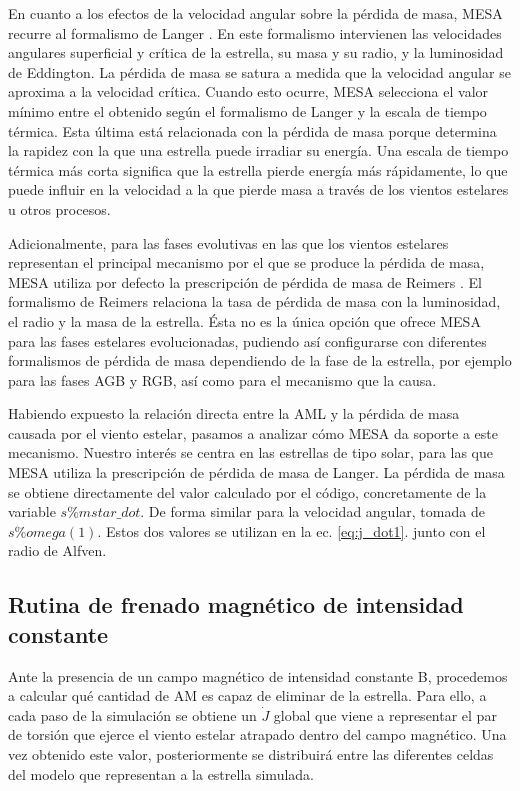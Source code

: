 En cuanto a los efectos de la velocidad angular sobre la pérdida de masa, MESA recurre al formalismo de Langer \cite{Langer1998, Paxton2013}. En este formalismo intervienen las velocidades angulares superficial y crítica de la estrella, su masa y su radio, y la luminosidad de Eddington. La pérdida de masa se satura a medida que la velocidad angular se aproxima a la velocidad crítica. Cuando esto ocurre, MESA selecciona el valor mínimo entre el obtenido según el formalismo de Langer y la escala de tiempo térmica. Esta última está relacionada con la pérdida de masa porque determina la rapidez con la que una estrella puede irradiar su energía. Una escala de tiempo térmica más corta significa que la estrella pierde energía más rápidamente, lo que puede influir en la velocidad a la que pierde masa a través de los vientos estelares u otros procesos.\par

Adicionalmente, para las fases evolutivas en las que los vientos estelares representan el principal mecanismo por el que se produce la pérdida de masa, MESA utiliza por defecto la prescripción de pérdida de masa de Reimers \cite{Reimers1975}. El formalismo de Reimers relaciona la tasa de pérdida de masa con la luminosidad, el radio y la masa de la estrella. Ésta no es la única opción que ofrece MESA para las fases estelares evolucionadas, pudiendo así configurarse con diferentes formalismos de pérdida de masa dependiendo de la fase de la estrella, por ejemplo para las fases AGB y RGB,  así como para el mecanismo que la causa. \par

Habiendo expuesto la relación directa entre la AML y la pérdida de masa causada por el viento estelar, pasamos a analizar cómo MESA da soporte a este mecanismo. Nuestro interés se centra en las estrellas de tipo solar, para las que MESA utiliza la prescripción de pérdida de masa de Langer. La pérdida de masa se obtiene directamente del valor calculado por el código, concretamente de la variable $s\% mstar\_dot$. De forma similar para la velocidad angular, tomada de $s\% omega(1)$. Estos dos valores se utilizan en la ec. \ref{eq:j_dot1}. junto con el radio de Alfven.

\subsection{Rutina de frenado magnético de intensidad constante} \label{sec:mb_cte_b}
Ante la presencia de un campo magnético de intensidad constante B, procedemos a calcular qué cantidad de AM es capaz de eliminar de la estrella. Para ello, a cada paso de la simulación se obtiene un $\Dot{J}$ global que viene a representar el par de torsión que ejerce el viento estelar atrapado dentro del campo magnético. Una vez obtenido este valor, posteriormente se distribuirá entre las diferentes celdas del modelo que representan a la estrella simulada.\par


